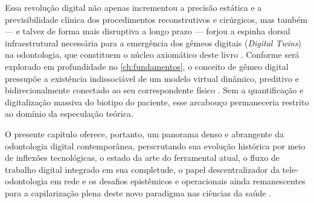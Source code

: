Essa revolução digital não apenas incrementou a precisão estática e a previsibilidade clínica dos procedimentos reconstrutivos e cirúrgicos, mas também — e talvez de forma mais disruptiva a longo prazo — forjou a espinha dorsal infraestrutural necessária para a emergência dos gêmeos digitais (\textit{Digital Twins}) na odontologia, que constituem o núcleo axiomático deste livro \cite{katsoulakis2024digital}. Conforme será explorado em profundidade no \autoref{ch:fundamentos}, o conceito de gêmeo digital pressupõe a existência indissociável de um modelo virtual dinâmico, preditivo e bidirecionalmente conectado ao seu correspondente físico \cite{robles2023opentwins}. Sem a quantificação e digitalização massiva do biotipo do paciente, esse arcabouço permaneceria restrito ao domínio da especulação teórica. 

O presente capítulo oferece, portanto, um panorama denso e abrangente da odontologia digital contemporânea, perscrutando sua evolução histórica por meio de inflexões tecnológicas, o estado da arte do ferramental atual, o fluxo de trabalho digital integrado em sua completude, o papel descentralizador da tele-odontologia em rede e os desafios epistêmicos e operacionais ainda remanescentes para a capilarização plena deste novo paradigma nas ciências da saúde \cite{khoshfekr2025digital}.
